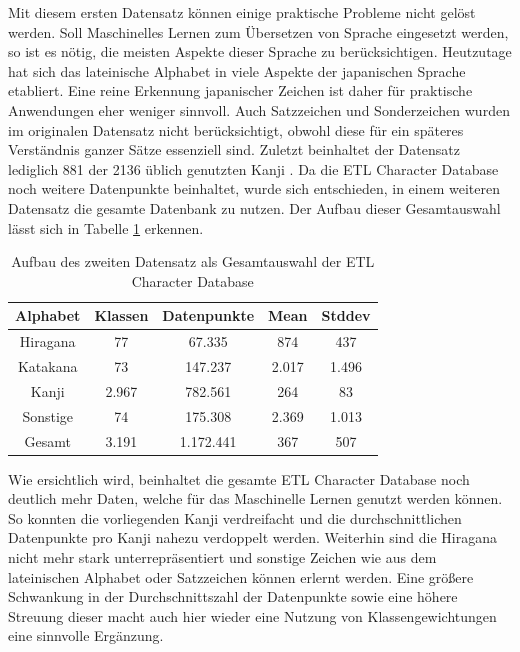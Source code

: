 \documentclass[twoside,a4paper]{IEEEtran}
\begin{document}
Mit diesem ersten Datensatz können einige praktische Probleme nicht gelöst werden. Soll Maschinelles Lernen zum Übersetzen von Sprache eingesetzt werden, so ist es nötig, die meisten Aspekte dieser Sprache zu berücksichtigen. Heutzutage hat sich das lateinische Alphabet in viele Aspekte der japanischen Sprache etabliert. Eine reine Erkennung japanischer Zeichen ist daher für praktische Anwendungen eher weniger sinnvoll. Auch Satzzeichen und Sonderzeichen wurden im originalen Datensatz nicht berücksichtigt, obwohl diese für ein späteres Verständnis ganzer Sätze essenziell sind. Zuletzt beinhaltet der Datensatz lediglich 881 der 2136 üblich genutzten Kanji \cite[S.3]{RHC}. Da die ETL Character Database noch weitere Datenpunkte beinhaltet, wurde sich entschieden, in einem weiteren Datensatz die gesamte Datenbank zu nutzen. Der Aufbau dieser Gesamtauswahl lässt sich in Tabelle \ref{data_total} erkennen.

\begin{table}[!htb]
	\caption{Aufbau des zweiten Datensatz als Gesamtauswahl der ETL Character Database}
	\label{data_total}
	\centering
	\begin{tabular}{|c|c|c|c|c|}
		\hline
		Alphabet & Klassen & Datenpunkte & Mean & Stddev\\
		\hline
		\hline
		Hiragana & 77 & 67.335 & 874 & 437\\
		\hline 
		Katakana & 73 & 147.237 & 2.017 & 1.496\\
		\hline
		Kanji & 2.967 & 782.561 & 264 & 83\\
		\hline
		Sonstige & 74 & 175.308 & 2.369 & 1.013\\
		\hline
		\hline
		Gesamt & 3.191 & 1.172.441 & 367 & 507\\
		\hline
	\end{tabular}
\end{table}
Wie ersichtlich wird, beinhaltet die gesamte ETL Character Database noch deutlich mehr Daten, welche für das Maschinelle Lernen genutzt werden können. So konnten die vorliegenden Kanji verdreifacht und die durchschnittlichen Datenpunkte pro Kanji nahezu verdoppelt werden. Weiterhin sind die Hiragana nicht mehr stark unterrepräsentiert und sonstige Zeichen wie aus dem lateinischen Alphabet oder Satzzeichen können erlernt werden. Eine größere Schwankung in der Durchschnittszahl der Datenpunkte sowie eine höhere Streuung dieser macht auch hier wieder eine Nutzung von Klassengewichtungen eine sinnvolle Ergänzung.
\end{document}
